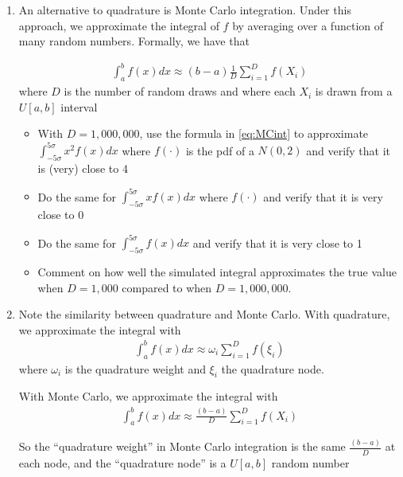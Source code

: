 \documentclass[12pt,english]{article}
\begin{document}
\begin{enumerate}
\begin{enumerate}
    \item An alternative to quadrature is Monte Carlo integration. Under this approach, we approximate the integral of $f$ by averaging over a function of many random numbers. Formally, we have that
    
    \begin{align}
        \int_a^b f\left(x\right)dx \approx \left(b-a\right)\frac{1}{D}\sum_{i=1}^D f\left(X_{i}\right)
        \label{eq:MCint}
    \end{align}
    where $D$ is the number of random draws and where each $X_i$ is drawn from a $U[a,b]$ interval
    
    \begin{itemize}
        \item With $D=1,000,000$, use the formula in \eqref{eq:MCint} to approximate $\int_{-5\sigma}^{5\sigma}x^{2}f\left(x\right)dx$ where $f\left(\cdot\right)$ is the pdf of a $N\left(0,2\right)$ and verify that it is (very) close to 4
        \item Do the same for $\int_{-5\sigma}^{5\sigma}xf\left(x\right)dx$ where $f\left(\cdot\right)$ and verify that it is very close to 0
        \item Do the same for $\int_{-5\sigma}^{5\sigma}f\left(x\right)dx$ and verify that it is very close to 1
        \item Comment on how well the simulated integral approximates the true value when $D=1,000$ compared to when $D=1,000,000$.
    \end{itemize}
    
    \item Note the similarity between quadrature and Monte Carlo.
    \bigskip
    With quadrature, we approximate the integral with
    \begin{align*}
        \int_a^b f\left(x\right)dx \approx \omega_{i}\sum_{i=1}^D f\left(\xi_{i}\right)
    \end{align*}
    where $\omega_{i}$ is the quadrature weight and $\xi_{i}$ the quadrature node.
    
    \bigskip
    
    With Monte Carlo, we approximate the integral with
    \begin{align*}
        \int_a^b f\left(x\right)dx \approx \frac{\left(b-a\right)}{D}\sum_{i=1}^D f\left(X_{i}\right)
    \end{align*}
    
    So the ``quadrature weight'' in Monte Carlo integration is the same $\frac{\left(b-a\right)}{D}$ at each node, and the ``quadrature node'' is a $U[a,b]$ random number
\end{enumerate}


\end{enumerate}
\end{document}
